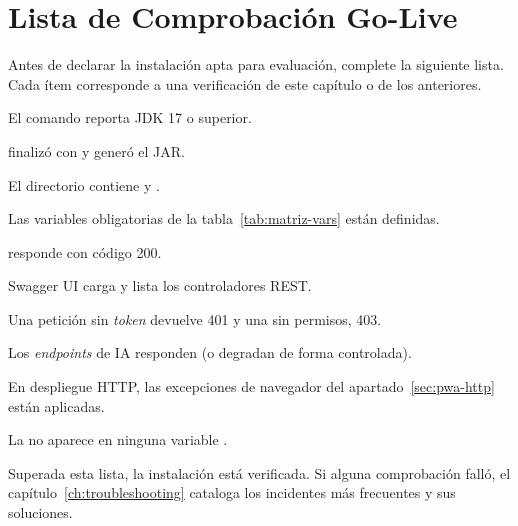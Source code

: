 \section{Lista de Comprobación Go-Live}%
\label{sec:golive}

Antes de declarar la instalación apta para evaluación, complete la siguiente lista. Cada
ítem corresponde a una verificación de este capítulo o de los anteriores.\par

\begin{ChecklistGoLive}
    \item El comando  reporta JDK 17 o superior.
    \item {} finalizó con  y generó el JAR.
    \item El directorio  contiene  y .
    \item Las variables obligatorias de la tabla~\ref{tab:matriz-vars} están definidas.
    \item {} responde  con código 200.
    \item Swagger UI carga y lista los controladores REST.
    \item Una petición sin \textit{token} devuelve 401 y una sin permisos, 403.
    \item Los \textit{endpoints} de IA responden (o degradan de forma controlada).
    \item En despliegue HTTP, las excepciones de navegador del apartado~\ref{sec:pwa-http} están aplicadas.
    \item La  no aparece en ninguna variable .
\end{ChecklistGoLive}

\par\vspace{0.2cm}
Superada esta lista, la instalación está verificada. Si alguna comprobación falló, el
capítulo~\ref{ch:troubleshooting} cataloga los incidentes más frecuentes y sus
soluciones.\par
